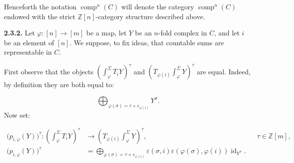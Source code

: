 Henceforth the notation $\operatorname{comp}^{n}(C)$ will denote the category
$\operatorname{comp}^{n}(C)$ endowed with the strict $\mathbb Z[n]$-category
structure described above.

\noindent\textbf{2.3.2.}\quad
Let $\varphi\colon[n]\longrightarrow[m]$ be a map, let $Y$ be an $n$-fold
complex in $C$, and let $i$ be an element of $[n]$. We suppose, to fix ideas,
that countable sums are representable in $C$.

First observe that the objects
$\left(\int_\varphi^\Sigma T_iY\right)^\tau$ and
$\left(T_{\varphi(i)}\int_\varphi^\Sigma Y\right)^\tau$ are equal.
Indeed, by definition they are both equal to:

\begin{equation*}
  \bigoplus_{\varphi(\sigma)=\tau+e_{\varphi(i)}}Y^\sigma.
\end{equation*}
Now set:

\begin{equation}
  \begin{aligned}
    \bigl(p_{i,\varphi}(Y)\bigr)^\tau\colon
    \left(\int_\varphi^\Sigma T_iY\right)^\tau
      &\longrightarrow
    \left(T_{\varphi(i)}\int_\varphi^\Sigma Y\right)^\tau,
      &&\tau\in\mathbb Z[m],\\[2pt]
    \bigl(p_{i,\varphi}(Y)\bigr)^\tau
      &=\bigoplus_{\varphi(\sigma)=\tau+e_{\varphi(i)}}
        \varepsilon(\sigma,i)\varepsilon(\varphi(\sigma),\varphi(i))
        \operatorname{id}_{Y^\sigma}.
  \end{aligned}
  \tag{2.3.2.1}
\end{equation}
